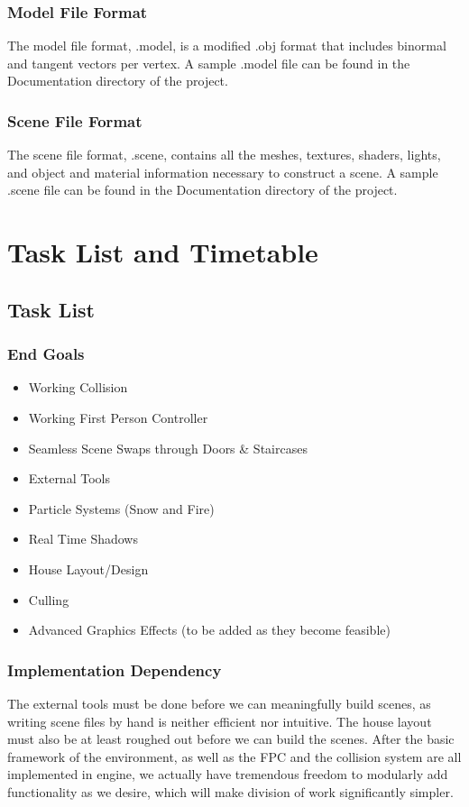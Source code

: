 \documentclass[11pt]{article} %
\begin{document}
\subsubsection{Model File Format}
The model file format, .model, is a modified .obj format that includes binormal and tangent vectors per vertex. A sample .model file can be found in the Documentation directory of the project.
\subsubsection{Scene File Format}
The scene file format, .scene, contains all the meshes, textures, shaders, lights, and object and material information necessary to construct a scene. A sample .scene file can be found in the Documentation directory of the project.

\section{ Task List and Timetable}

\subsection{Task List}
\subsubsection*{End Goals}
\begin{itemize}
\item Working Collision
\item Working First Person Controller
\item Seamless Scene Swaps through Doors \& Staircases
\item External Tools
\item Particle Systems (Snow and Fire)
\item Real Time Shadows
\item House Layout/Design
\item Culling
\item Advanced Graphics Effects (to be added as they become feasible)
\end{itemize}
\subsubsection*{Implementation Dependency}
The external tools must be done before we can meaningfully build scenes, as writing scene files by hand is neither efficient nor intuitive. The house layout must also be at least roughed out before we can build the scenes. After the basic framework of the environment, as well as the FPC and the collision system are all implemented in engine, we actually have tremendous freedom to modularly add functionality as we desire, which will make division of work significantly simpler.
\end{document}
